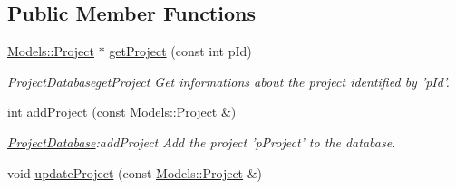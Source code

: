 \subsection*{Public Member Functions}
\begin{DoxyCompactItemize}
\item 
\hyperlink{classModels_1_1Project}{Models\+::\+Project} $\ast$ \hyperlink{classDatabase_1_1ProjectDatabase_ae656663ce7e517e13815198f66341b2a}{get\+Project} (const int p\+Id)
\begin{DoxyCompactList}\small\item\em Project\+Databaseget\+Project Get informations about the project identified by 'p\+Id'. \end{DoxyCompactList}\item 
int \hyperlink{classDatabase_1_1ProjectDatabase_a904588d19669d5e391518a946fd94ddf}{add\+Project} (const \hyperlink{classModels_1_1Project}{Models\+::\+Project} \&)
\begin{DoxyCompactList}\small\item\em \hyperlink{classDatabase_1_1ProjectDatabase}{Project\+Database}\+:add\+Project Add the project 'p\+Project' to the database. \end{DoxyCompactList}\item 
\hypertarget{classDatabase_1_1ProjectDatabase_a5a839ed196050cf41a1b0f1073757599}{void \hyperlink{classDatabase_1_1ProjectDatabase_a5a839ed196050cf41a1b0f1073757599}{update\+Project} (const \hyperlink{classModels_1_1Project}{Models\+::\+Project} \&)}\label{classDatabase_1_1ProjectDatabase_a5a839ed196050cf41a1b0f1073757599}


\end{DoxyCompactItemize}
